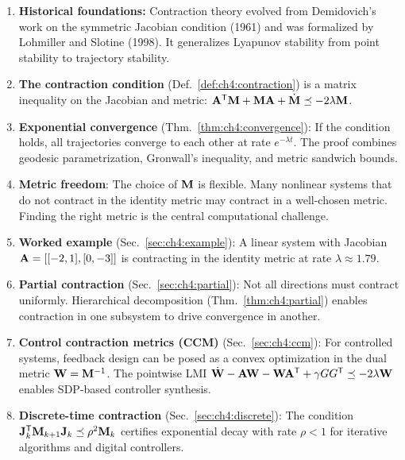 \begin{enumerate}
\item \textbf{Historical foundations:} Contraction theory evolved from Demidovich's
      work on the symmetric Jacobian condition (1961) and was formalized by Lohmiller
      and Slotine (1998). It generalizes Lyapunov stability from point stability to
      trajectory stability.

\item \textbf{The contraction condition} (Def.~\ref{def:ch4:contraction}) is a matrix
      inequality on the Jacobian and metric:
      $\mathbf{A}^{\mathsf{T}}\mathbf{M} + \mathbf{M}\mathbf{A} + \dot{\mathbf{M}} \preceq -2\lambda\mathbf{M}$.

\item \textbf{Exponential convergence} (Thm.~\ref{thm:ch4:convergence}): If the condition
      holds, all trajectories converge to each other at rate $e^{-\lambda t}$. The proof
      combines geodesic parametrization, Gronwall's inequality, and metric sandwich bounds.

\item \textbf{Metric freedom}: The choice of $\mathbf{M}$ is flexible. Many nonlinear systems
      that do not contract in the identity metric may contract in a well-chosen metric.
      Finding the right metric is the central computational challenge.

\item \textbf{Worked example} (Sec.~\ref{sec:ch4:example}): A linear system with Jacobian
      $\mathbf{A} = [[-2,1],[0,-3]]$ is contracting in the identity metric at rate $\lambda \approx 1.79$.

\item \textbf{Partial contraction} (Sec.~\ref{sec:ch4:partial}): Not all directions must
      contract uniformly. Hierarchical decomposition (Thm.~\ref{thm:ch4:partial})
      enables contraction in one subsystem to drive convergence in another.

\item \textbf{Control contraction metrics (CCM)} (Sec.~\ref{sec:ch4:ccm}): For controlled
      systems, feedback design can be posed as a convex optimization in the dual metric
      $\mathbf{W} = \mathbf{M}^{-1}$. The pointwise LMI
      $\dot{\mathbf{W}} - \mathbf{A}\mathbf{W} - \mathbf{W}\mathbf{A}^{\mathsf{T}} + \gamma GG^{\mathsf{T}} \preceq -2\lambda\mathbf{W}$
      enables SDP-based controller synthesis.

\item \textbf{Discrete-time contraction} (Sec.~\ref{sec:ch4:discrete}): The condition
      $\mathbf{J}_k^{\mathsf{T}} \mathbf{M}_{k+1} \mathbf{J}_k \preceq \rho^2 \mathbf{M}_k$ certifies exponential
      decay with rate $\rho < 1$ for iterative algorithms and digital controllers.


\end{enumerate}
